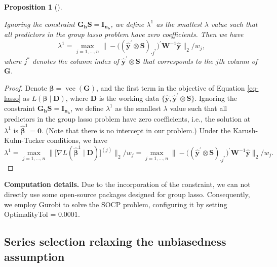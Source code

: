 \documentclass[
  11pt]{article}
\theoremstyle{plain}
\newtheorem{proposition}{Proposition}[section]
\theoremstyle{remark}
\begin{document}
\begin{proposition}[]\protect\hypertarget{prp-3}{}\label{prp-3}

Ignoring the constraint \(\bm{G_h S}=\bm{I_{n_b}}\), we define
\(\lambda^{1}\) as the smallest \(\lambda\) value such that all
predictors in the group lasso problem have zero coefficients. Then we
have \[
\lambda^{1} = \max_{j=1, \ldots, n}\big\|-\big((\hat{\bm{y}}^{\prime} \otimes \bm{S})_{\cdot j^{*}}\big)^{\prime} \bm{W}^{-1} \hat{\bm{y}}\big\|_2 / w_j,
\] where \(j^{*}\) denotes the column index of
\(\hat{\bm{y}}^{\prime} \otimes \bm{S}\) that corresponds to the \(j\)th
column of \(\bm{G}\).

\end{proposition}

\begin{proof}
Denote \(\bm{\beta} = \operatorname{vec}(\bm{G})\), and the first term
in the objective of Equation \eqref{eq-lasso} as
\(L\left(\bm{\beta} \mid \bm{D}\right)\), where \(\bm{D}\) is the
working data
\(\{\hat{\bm{y}} , \hat{\bm{y}}^{\prime} \otimes \bm{S}\}\). Ignoring
the constraint \(\bm{G_h S}=\bm{I_{n_b}}\), we define \(\lambda^{1}\) as
the smallest \(\lambda\) value such that all predictors in the group
lasso problem have zero coefficients, i.e., the solution at
\(\lambda^{1}\) is \(\hat{\bm{\beta}}^{1}=\bm{0}\). (Note that there is
no intercept in our problem.) Under the Karush-Kuhn-Tucker conditions,
we have \[
\lambda^{1}
 = \max_{j=1, \ldots, n}\big\|\big[\nabla L(\hat{\bm{\beta}}^{1} \mid \bm{D})\big]^{(j)}\big\|_2 / w_j
 = \max_{j=1, \ldots, n}\big\|-\big((\hat{\bm{y}}^{\prime} \otimes \bm{S})_{\cdot j^{*}}\big)^{\prime} \bm{W}^{-1} \hat{\bm{y}}\big\|_2 / w_j.
\]
\end{proof}

\textbf{Computation details.} Due to the incorporation of the
constraint, we can not directly use some open-source packages designed
for group lasso. Consequently, we employ Gurobi to solve the SOCP
problem, configuring it by setting OptimalityTol = \(0.0001\).

\subsection{Series selection relaxing the unbiasedness
assumption}\label{sec-unconstrained}
\end{document}
